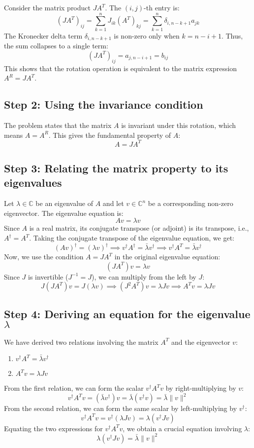 \documentclass[12pt,a4paper]{article}
\theoremstyle{definition}
\begin{document}
    Consider the matrix product $JA^T$. The $(i,j)$-th entry is:
    $$(JA^T)_{ij} = \sum_{k=1}^n J_{ik} (A^T)_{kj} = \sum_{k=1}^n \delta_{i, n-k+1} a_{jk}$$
    The Kronecker delta term $\delta_{i, n-k+1}$ is non-zero only when $k=n-i+1$. Thus, the sum collapses to a single term:
    $$(JA^T)_{ij} = a_{j, n-i+1} = b_{ij}$$
    This shows that the rotation operation is equivalent to the matrix expression $A^R = JA^T$.

    \subsection*{Step 2: Using the invariance condition}
    The problem states that the matrix $A$ is invariant under this rotation, which means $A = A^R$. This gives the fundamental property of $A$:
    $$A = JA^T$$

    \subsection*{Step 3: Relating the matrix property to its eigenvalues}
    Let $\lambda \in \mathbb{C}$ be an eigenvalue of $A$ and let $v \in \mathbb{C}^n$ be a corresponding non-zero eigenvector. The eigenvalue equation is:
    $$Av = \lambda v$$
    Since $A$ is a real matrix, its conjugate transpose (or adjoint) is its transpose, i.e., $A^\dagger = A^T$. Taking the conjugate transpose of the eigenvalue equation, we get:
    $$(Av)^\dagger = (\lambda v)^\dagger \implies v^\dagger A^\dagger = \bar{\lambda} v^\dagger \implies v^\dagger A^T = \bar{\lambda} v^\dagger$$
    Now, we use the condition $A = JA^T$ in the original eigenvalue equation:
    $$(JA^T)v = \lambda v$$
    Since $J$ is invertible ($J^{-1}=J$), we can multiply from the left by $J$:
    $$J(JA^T)v = J(\lambda v) \implies (J^2 A^T)v = \lambda Jv \implies A^T v = \lambda Jv$$

    \subsection*{Step 4: Deriving an equation for the eigenvalue $\lambda$}
    We have derived two relations involving the matrix $A^T$ and the eigenvector $v$:
    \begin{enumerate}
        \item $v^\dagger A^T = \bar{\lambda} v^\dagger$
        \item $A^T v = \lambda Jv$
    \end{enumerate}

    From the first relation, we can form the scalar $v^\dagger A^T v$ by right-multiplying by $v$:
    $$v^\dagger A^T v = (\bar{\lambda} v^\dagger) v = \bar{\lambda} (v^\dagger v) = \bar{\lambda} \|v\|^2$$
    From the second relation, we can form the same scalar by left-multiplying by $v^\dagger$:
    $$v^\dagger A^T v = v^\dagger (\lambda Jv) = \lambda (v^\dagger J v)$$
    Equating the two expressions for $v^\dagger A^T v$, we obtain a crucial equation involving $\lambda$:
    $$\lambda (v^\dagger J v) = \bar{\lambda} \|v\|^2$$
\end{document}
